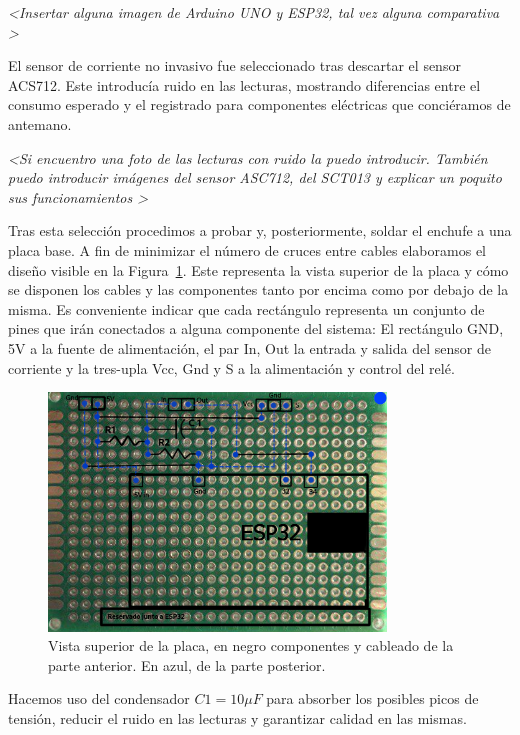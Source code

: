 \documentclass[a4paper,10pt]{article}
\begin{document}
\textit{\textless Insertar alguna imagen de Arduino UNO y ESP32, tal
  vez alguna comparativa \textgreater}

El sensor de corriente no invasivo fue seleccionado tras descartar el
sensor ACS712\cite{ACS712DatasheetPDF}. Este introducía ruido en las
lecturas, mostrando diferencias entre el consumo esperado y el
registrado para componentes eléctricas que conciéramos de antemano.

\textit{\textless Si encuentro una foto de las lecturas con ruido la
  puedo introducir. También puedo introducir imágenes del sensor
  ASC712, del SCT013 y explicar un poquito sus funcionamientos \textgreater}

Tras esta selección procedimos a probar y, posteriormente, soldar el
enchufe a una placa base. A fin de minimizar el número de cruces entre
cables elaboramos el diseño visible en
la Figura~\ref{fig:placa-sup-arriba-abajo}. Este representa la vista superior de
la placa y cómo se disponen los cables y las componentes tanto por
encima como por debajo de la misma. Es conveniente indicar que cada
rectángulo representa un conjunto de pines que irán conectados a
alguna componente del sistema: El rectángulo GND, 5V a la fuente de
alimentación, el par In, Out la entrada y salida del sensor de
corriente y la tres-upla Vcc, Gnd y S a la alimentación y control del
relé.

\begin{figure}
  \centering
  \includegraphics[width=0.8\textwidth]{img/dibujo_placa_vista_superior_arriba_y_abajo.png}
  \caption{Vista superior de la placa, en negro componentes y cableado
  de la parte anterior. En azul, de la parte posterior.}\label{fig:placa-sup-arriba-abajo}
\end{figure}

Hacemos uso del condensador $C1 = 10\mu F$ para absorber los
posibles picos de tensión, reducir el ruido en las lecturas y
garantizar calidad en las mismas.
\end{document}
